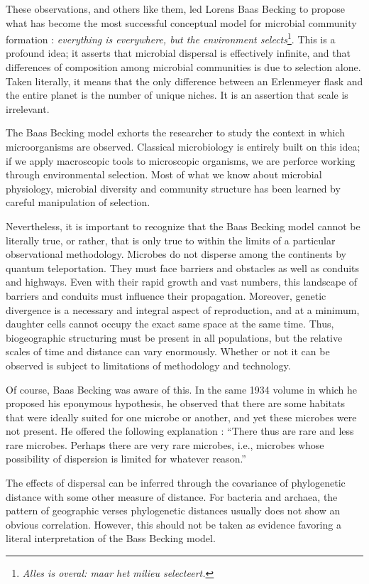 These observations, and others like them, led Lorens Baas Becking to propose what has become the most successful conceptual model for microbial community formation : {\em everything is everywhere, but the environment selects}\footnote{{\em Alles is overal: maar het milieu selecteert.}}. This is a profound idea; it asserts that microbial dispersal is effectively infinite, and that differences of composition among microbial communities is due to selection alone. Taken literally, it means that the only difference between an Erlenmeyer flask and the entire planet is the number of unique niches. It is an assertion that scale is irrelevant.

The Baas Becking model exhorts the researcher to study the context in which microorganisms are observed. Classical microbiology is entirely built on this idea; if we apply macroscopic tools to microscopic organisms, we are perforce working through environmental selection. Most of what we know about microbial physiology, microbial diversity and community structure has been learned by careful manipulation of selection.

Nevertheless, it is important to recognize that the Baas Becking model cannot be literally true, or rather, that is only true to within the limits of a particular observational methodology. Microbes do not disperse among the continents by quantum teleportation. They must face barriers and obstacles as well as conduits and highways. Even with their rapid growth and vast numbers, this landscape of barriers and conduits must influence their propagation. Moreover, genetic divergence is a necessary and integral aspect of reproduction, and at a minimum, daughter cells cannot occupy the exact same space at the same time. Thus, biogeographic structuring must be present in all populations, but the relative scales of time and distance can vary enormously. Whether or not it can be observed is subject to limitations of methodology and technology.

Of course, Baas Becking was aware of this. In the same 1934 volume in which he proposed his eponymous hypothesis, he observed that there are some habitats that were ideally suited for one microbe or another, and yet these microbes were not present. He offered the following explanation : ``There thus are rare and less rare microbes. Perhaps there are very rare microbes, i.e., microbes whose possibility of dispersion is limited for whatever reason.''

The effects of dispersal can be inferred through the covariance of phylogenetic distance with some other measure of distance. For bacteria and archaea, the pattern of geographic verses phylogenetic distances usually does not show an obvious correlation. However, this should not be taken as evidence favoring a literal interpretation of the Bass Becking model.

